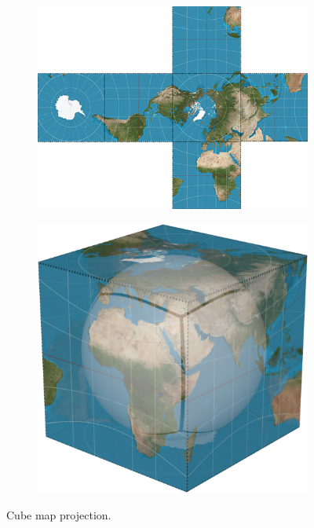 \begin{figure}[htbp]
    \centering
    \begin{subfigure}[bt]{0.4\textwidth}
        \includegraphics[width=\textwidth]{figures/developable_projected/cube_map.png}
    \end{subfigure}
    \qquad
    \begin{subfigure}[bt]{0.15\textwidth}
        \includegraphics[width=\textwidth]{figures/map_projection/projection_cube.png}
    \end{subfigure}
    \caption{Cube map projection.}
    \label{fig:proj_cube}
\end{figure}

